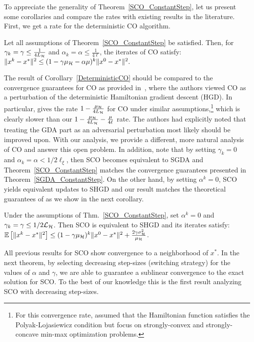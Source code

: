 \documentclass{article}
\begin{document}
To appreciate the generality of Theorem~\ref{SCO_ConstantStep}, let us present some corollaries and compare the rates with existing results in the literature. First, we get a rate for the deterministic CO algorithm. 
\begin{corollary}[Deterministic CO]
\label{DeterministicCO}
Let all assumptions of Theorem~\ref{SCO_ConstantStep} be satisfied. Then, for $\gamma_k=\gamma \leq \frac{1}{4 L_{{\cal H}}}$ and $\alpha_k=\alpha \leq \frac{1}{4\ell}$, the iterates of CO satisfy:
$
	\|x^{k}-x^*\|^2 \leq(1-\gamma\mu_{{\cal H}}  - \alpha\mu )^k\|x^0-x^*\|^2.
$
\end{corollary}
The result of Corollary~\ref{DeterministicCO} should be compared to the convergence guarantees for CO as provided in~\citet{abernethy2021last}, where the authors viewed CO as a perturbation of the deterministic Hamiltonian gradient descent (HGD). In particular, \citet{abernethy2021last} gives the rate $1-\frac{\mu_{{\cal H}}}{4 L_{\cal H}}$ for CO under similar assumptions,\footnote{For this convergence rate, \citet{abernethy2021last} assumed that the Hamiltonian function satisfies the Polyak-Lojasiewicz condition but focus on strongly-convex and strongly-concave min-max optimization problems.} which is clearly slower than our $1-\frac{\mu_{{\cal H}}}{4 L_{\cal H}}  - \frac{\mu}{4\ell}$ rate. The authors had explicitly noted that treating the GDA part as an adversarial perturbation most likely should be improved upon. With our analysis, we provide a different, more natural analysis of CO and answer this open problem.
In addition, note that by setting $\gamma_k=0$ and $\alpha_k=\alpha < 1/2  \ell_{\xi}$, then SCO becomes equivalent to SGDA and Theorem~\ref{SCO_ConstantStep} matches the convergence guarantees presented in Theorem~\ref{SGDA_ConstantStep}. On the other hand, by setting $\alpha^k=0$, SCO yields equivalent updates to SHGD and our result matches the theoretical guarantees of \citet{loizou2020stochastic} as we show in the next corollary.
\begin{corollary}
\label{CorollarySHGD}
Under the assumptions of Thm.~\ref{SCO_ConstantStep}, set $\alpha^k=0$ and $\gamma_k=\gamma \leq 1/2{\cal L}_{{\cal H}}$. Then SCO is equivalent to SHGD and its iterates satisfy: $\mathbb{E}\left[ \|x^{k}-x^*\|^2 \right]\leq(1-\gamma\mu_{{\cal H}} )^k\|x^0-x^*\|^2 + \frac{2 \gamma \sigma_{{\cal H}}^2}{\mu_{{\cal H}}}$.
\end{corollary}
All previous results for SCO show convergence to a neighborhood of $x^*$. In the next theorem, by selecting decreasing step-sizes (switching strategy) for the values of $\alpha$ and $\gamma$, we are able to  guarantee a sublinear convergence to the exact solution for SCO. To the best of our knowledge this is the first result analyzing SCO with decreasing step-sizes.
\end{document}
